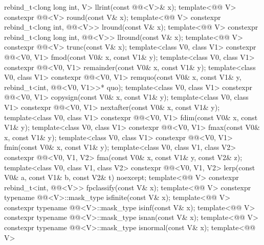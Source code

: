 \begin{codeblock}
{    rebind_t<long long int, V> llrint(const @@<V>& x);
  template<@@ V>
    constexpr @@<V> round(const V& x);
  template<@@ V>
    constexpr rebind_t<long int, @@<V>> lround(const V& x);
  template<@@ V>
    constexpr rebind_t<long long int, @@<V>> llround(const V& x);
  template<@@ V>
    constexpr @@<V> trunc(const V& x);
  template<class V0, class V1>
    constexpr @@<V0, V1> fmod(const V0& x, const V1& y);
  template<class V0, class V1>
    constexpr @@<V0, V1> remainder(const V0& x, const V1& y);
  template<class V0, class V1>
    constexpr @@<V0, V1>
      remquo(const V0& x, const V1& y, rebind_t<int, @@<V0, V1>>* quo);
  template<class V0, class V1>
    constexpr @@<V0, V1> copysign(const V0& x, const V1& y);
  template<class V0, class V1>
    constexpr @@<V0, V1> nextafter(const V0& x, const V1& y);
  template<class V0, class V1>
    constexpr @@<V0, V1> fdim(const V0& x, const V1& y);
  template<class V0, class V1>
    constexpr @@<V0, V1> fmax(const V0& x, const V1& y);
  template<class V0, class V1>
    constexpr @@<V0, V1> fmin(const V0& x, const V1& y);
  template<class V0, class V1, class V2>
    constexpr @@<V0, V1, V2> fma(const V0& x, const V1& y, const V2& z);
  template<class V0, class V1, class V2>
    constexpr @@<V0, V1, V2>
    lerp(const V0& a, const V1& b, const V2& t) noexcept;
  template<@@ V>
    constexpr rebind_t<int, @@<V>> fpclassify(const V& x);
  template<@@ V>
    constexpr typename @@<V>::mask_type isfinite(const V& x);
  template<@@ V>
    constexpr typename @@<V>::mask_type isinf(const V& x);
  template<@@ V>
    constexpr typename @@<V>::mask_type isnan(const V& x);
  template<@@ V>
    constexpr typename @@<V>::mask_type isnormal(const V& x);
  template<@@ V>
}
\end{codeblock}
